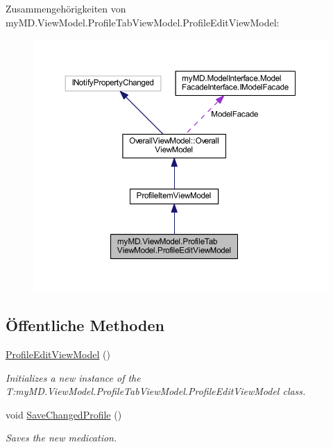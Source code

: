 Zusammengehörigkeiten von my\+M\+D.\+View\+Model.\+Profile\+Tab\+View\+Model.\+Profile\+Edit\+View\+Model\+:\nopagebreak
\begin{figure}[H]
\begin{center}
\leavevmode
\includegraphics[width=350pt]{classmy_m_d_1_1_view_model_1_1_profile_tab_view_model_1_1_profile_edit_view_model__coll__graph}
\end{center}
\end{figure}
\subsection*{Öffentliche Methoden}
\begin{DoxyCompactItemize}
\item 
\mbox{\hyperlink{classmy_m_d_1_1_view_model_1_1_profile_tab_view_model_1_1_profile_edit_view_model_a92ac6c760b9ffc99eb62a3eeb754d1bf}{Profile\+Edit\+View\+Model}} ()
\begin{DoxyCompactList}\small\item\em Initializes a new instance of the T\+:my\+M\+D.\+View\+Model.\+Profile\+Tab\+View\+Model.\+Profile\+Edit\+View\+Model class. \end{DoxyCompactList}\item 
void \mbox{\hyperlink{classmy_m_d_1_1_view_model_1_1_profile_tab_view_model_1_1_profile_edit_view_model_a1ebfb3a905248cbf7e96a566dc7a4e9c}{Save\+Changed\+Profile}} ()
\begin{DoxyCompactList}\small\item\em Saves the new medication. \end{DoxyCompactList}\end{DoxyCompactItemize}
